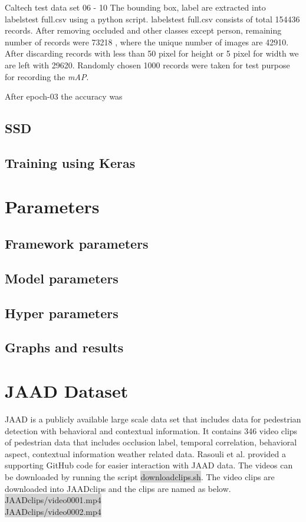 Caltech test data set 06 - 10
The bounding box, label are extracted into labels\textunderscore test \textunderscore full.csv using a python script. labels\textunderscore test \textunderscore full.csv consists of total 154436 records.
After removing occluded and other classes except person, remaining number of records were 73218 , where the unique number of images are 42910. After discarding records with less than 50 pixel for height or 5 pixel for width we are left with 29620. Randomly chosen 1000 records were taken for test purpose for recording the \textit{mAP}.



After epoch-03 the accuracy was


  
\subsection{SSD}
\subsection{Training using Keras}
\section{Parameters}
\subsection{Framework parameters}
\subsection{Model parameters}
\subsection{Hyper parameters}
\subsection{Graphs and results}

\section{JAAD Dataset}

JAAD \cite{rasouli2017agreeing} is a publicly available large scale data set that includes data for pedestrian detection with behavioral and contextual information. It contains 346 video clips of pedestrian data that includes occlusion label, temporal correlation, behavioral aspect, contextual information weather related data. Rasouli et al. provided a supporting GitHub code for easier interaction with JAAD data. The videos can be downloaded by running the script \colorbox{lightgray}{download\textunderscore clips.sh}. The video clips are downloaded into JAAD\textunderscore clips and the clips are named as below.\\
\colorbox{lightgray} {JAAD\textunderscore clips/video\textunderscore  0001.mp4} \\
\colorbox{lightgray} {JAAD\textunderscore clips/video\textunderscore  0002.mp4}

